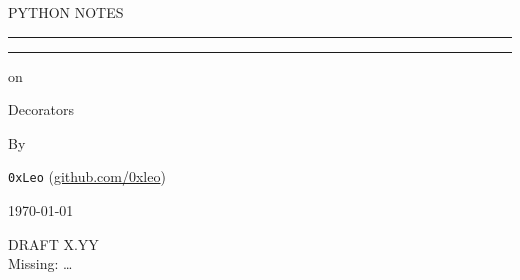 \begin{titlepage}
	\vspace{0.75\baselineskip} %
	
	{\LARGE PYTHON NOTES\\} %
	
	\vspace{0.75\baselineskip} %
	
	\rule{\textwidth}{0.4pt}\vspace*{-\baselineskip}\vspace{3.2pt} %
	\rule{\textwidth}{1.6pt} %
	
	\vspace{2\baselineskip} %
	
	 on
	
	\vspace*{3\baselineskip} %
	
	Decorators
	
	\vspace*{3\baselineskip} %
	
	
	By
	
	\vspace{0.5\baselineskip} %
	
	{\normalfont \Large \texttt{0xLeo} (\url{github.com/0xleo}) \\} %
	
	\vspace{0.5\baselineskip} %
	
	
	\vfill %
	
	
	
	\vspace{0.3\baselineskip} %
	
	\today %
	
	{DRAFT X.YY} %
	{\\Missing: \ldots}

\end{titlepage}

